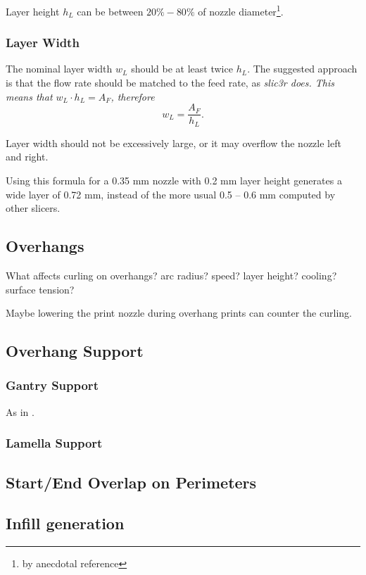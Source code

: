 \documentclass[12pt,a4paper,oneside,openany]{article}
\begin{document}
Layer height $h_L$ can be between $20\% - 80\%$ of nozzle diameter\footnote{by anecdotal reference}.

\subsubsection {Layer Width}

The nominal layer width $w_L$ should be at least twice $h_L$. The suggested approach is that the flow rate should be matched to the feed rate, as \em slic3r \em does. This means that $w_L \cdot h_L = A_F$, therefore $$w_L = \frac{A_F}{h_L}.$$

Layer width should not be excessively large, or it may overflow the nozzle left and right.

Using this formula for a 0.35 mm nozzle with 0.2 mm layer height generates a wide layer of 0.72 mm, instead of the more usual 0.5 – 0.6 mm computed by other slicers.

\subsection{Overhangs}

What affects curling on overhangs? arc radius? speed? layer height? cooling? surface tension?

Maybe lowering the print nozzle during overhang prints can counter the curling.

\subsection{Overhang Support}

\subsubsection{Gantry Support}

As in \cite{gsh}.

\subsubsection{Lamella Support}




\subsection{Start/End Overlap on Perimeters}

\subsection{Infill generation}
\end{document}
